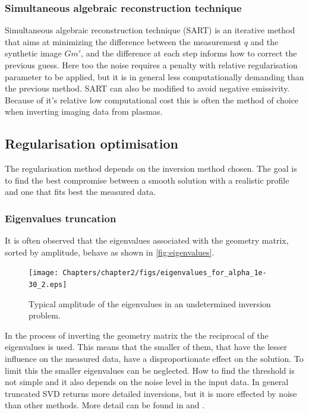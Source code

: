 \subsubsection{Simultaneous algebraic reconstruction technique}
Simultaneous algebraic reconstruction technique (SART) is an iterative method that aims at minimizing the difference between the measurement $q$ and the synthetic image $Gm'$, and the difference at each step informs how to correct the previous guess. Here too the noise requires a penalty with relative regularisation parameter to be applied, but it is in general less computationally demanding than the previous method. SART can also be modified to avoid negative emissivity. Because of it's relative low computational cost this is often the method of choice when inverting imaging data from plasmas.

\subsection{Regularisation optimisation}
The regularisation method depends on the inversion method chosen. The goal is to find the best compromise between a smooth solution with a realistic profile and one that fits best the measured data.
\subsubsection{Eigenvalues truncation}
It is often observed that the eigenvalues associated with the geometry matrix, sorted by amplitude, behave as shown in \autoref{fig:eigenvalues}.

\begin{figure}
	\centering
	\texttt{[image: Chapters/chapter2/figs/eigenvalues\_for\_alpha\_1e-30\_2.eps]}
	\caption{Typical amplitude of the eigenvalues in an undetermined inversion problem.}
	\label{fig:eigenvalues}
\end{figure}

In the process of inverting the geometry matrix the the reciprocal of the eigenvalues is used. This means that the smaller of them, that have the lesser influence on the measured data, have a disproportionate effect on the solution. To limit this the smaller eigenvalues can be neglected. How to find the threshold is not simple and it also depends on the noise level in the input data. In general truncated SVD returns more detailed inversions, but it is more effected by noise than other methods. More detail can be found in \cite{Schou2015} and \cite{Widman2002}.

